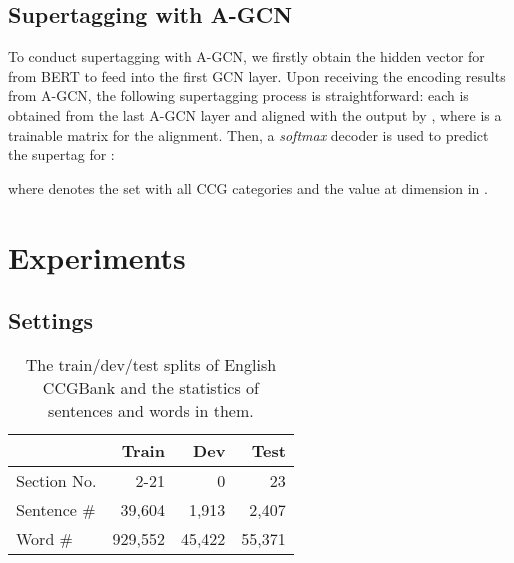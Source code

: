 \documentclass[11pt,a4paper]{article}
\begin{document}
\subsection{Supertagging with A-GCN}

To conduct supertagging with A-GCN, we firstly obtain the hidden vector  for  from BERT \cite{devlin-etal-2019-bert} to feed into the first GCN layer.
Upon receiving the encoding results from A-GCN, the following supertagging process is straightforward:
each  is obtained from the last A-GCN layer and aligned with the output by , where  is
a trainable matrix for the alignment.
Then, a \textit{softmax} decoder is used to predict the supertag  for :

where  denotes the set with all CCG categories and  the value at dimension  in .





\section{Experiments}

\subsection{Settings}



\begin{table}[t]
\begin{center}
\begin{tabular}{l | r r r }
    \toprule
& \textbf{Train} & \textbf{Dev} & \textbf{Test} \\
    \midrule
    Section No.
    & 2-21 & 0 & 23 \\
    \midrule
    Sentence \# 
    & 39,604 & 1,913 & 2,407
    \\
Word \#
    & 929,552 & 45,422 & 55,371 
    \\
    \bottomrule
\end{tabular}
\vspace{-0.3cm}
\end{center}
\caption{The train/dev/test splits of English CCGBank and the statistics of sentences and words in them.
}
\label{tab: dataset details}
\end{table}
\end{document}
